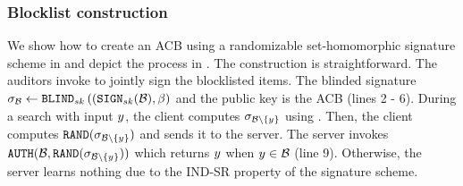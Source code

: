 \subsubsection{Blocklist construction}
%
We show how to create an ACB using a randomizable set-homomorphic signature scheme in  and depict the process in . The construction is straightforward. The auditors invoke \distSigningFunc to jointly sign the blocklisted items. The blinded signature  $\genericSig[\blocklist] \assign \blind[\privKey]\left((\signingAlg[\privKey](\blocklist), \blindingFactor\right)$ and the public key is the ACB (lines 2 - 6). During a search with input $\genericCInputElmt$, the client computes $\genericSig[\blocklist \setminus \{\genericCInputElmt\}]$ using   . Then, the client computes $ \randomize(\genericSig[\blocklist \setminus \{\genericCInputElmt\}])$ and sends it to the server. The server invokes $\verifyRand(\blocklist, \randomize(\genericSig[\blocklist \setminus \{\genericCInputElmt\}]))$ which returns $\genericCInputElmt$ when $\genericCInputElmt \in \blocklist$ (line 9). Otherwise, the server learns nothing due to the IND-SR property of the signature scheme. 

